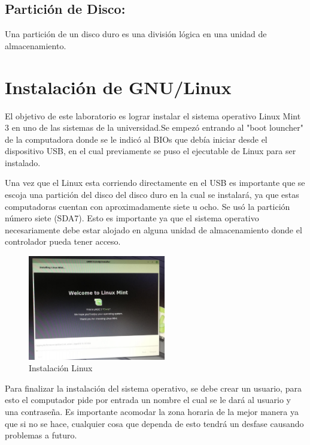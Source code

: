 \documentclass[
  letterpaper, 
  maincolor=black,
  sectioncolor=black!90,
  subsectioncolor=black!70,
  itemtextcolor=black!40,
]{fortysecondscv}
\begin{document}
    \subsection{Partición de Disco:}
    Una partición de un disco duro es una división lógica en una unidad de almacenamiento.
\section{Instalación de GNU/Linux}
    El objetivo de este laboratorio es lograr instalar el sistema operativo Linux Mint 3 en uno de las sistemas de la universidad.Se empezó entrando al "boot louncher" de la computadora donde se le indicó al BIOs que debía iniciar desde el dispositivo USB, en el cual previamente se puso el ejecutable de Linux para ser instalado.
    
    
    Una vez que el Linux esta corriendo directamente en el USB es importante que se escoja una partición del disco del disco duro en la cual se instalará, ya que estas computadoras cuentan con aproximadamente siete u ocho. Se usó la partición número siete (SDA7). Esto es importante ya que el sistema operativo necesariamente debe estar alojado en alguna unidad de almacenamiento donde el controlador pueda tener acceso. 
    
    
    \begin{figure}
        \begin{center}
            \includegraphics[width=6cm,lenght=5cm]{img/imagen1.jpg}    
        \end{center}
        \caption{Instalación Linux}
    \end{figure}
    
    
    Para finalizar la instalación del sistema operativo, se  debe crear un usuario, para esto el computador pide por entrada un nombre el cual se le dará al usuario y una contraseña. Es importante acomodar la zona horaria de la mejor manera ya que si no se hace, cualquier cosa que dependa de esto tendrá un desfase causando problemas a futuro.
    
\end{document}
